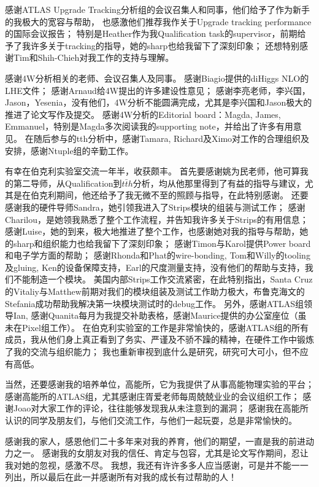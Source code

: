 感谢ATLAS Upgrade Tracking分析组的会议召集人和同事，他们给予了作为新手的我极大的宽容与帮助，
也感激他们推荐我作关于Upgrade tracking performance的国际会议报告；
特别是Heather作为我Qualification task的supervisor，前期给予了我许多关于tracking的指导，她的sharp也给我留下了深刻印象；
还想特别感谢Tim和Shih-Chieh对我工作的支持与理解。

感谢4W分析相关的老师、会议召集人及同事。
感谢Biagio提供的diHiggs NLO的LHE文件；
感谢Arnaud给4W提出的许多建设性意见；
感谢李亮老师，李兴国，Jason，Yesenia，没有他们，4W分析不能圆满完成，尤其是李兴国和Jason极大的推进了论文写作及提交。
感谢4W分析的Editorial board：Magda, James, Emmanuel，特别是Magda多次阅读我的supporting note，并给出了许多有用意见。
在随后参与的tth分析中，感谢Tamara, Richard及Ximo对工作的合理组织及安排，感谢Ntuple组的辛勤工作。

有幸在伯克利实验室交流一年半，收获颇丰。
首先要感谢姚为民老师，他可算我的第二导师，从Qualification到$t\bar{t}h$分析，均从他那里得到了有益的指导与建议，尤其是在伯克利期间，他还给予了我无微不至的照顾与指导，在此特别感谢。
还要感谢我的硬件导师Sandra，她引领我进入了Strips模块的组装与测试工作；
感谢Charilou，是她领我熟悉了整个工作流程，并告知我许多关于Strips的有用信息；
感谢Luise，她的到来，极大地推进了整个工作，也感谢她对我的指导与帮助，她的sharp和组织能力也给我留下了深刻印象；
感谢Timon与Karol提供Power board和电子学方面的帮助；
感谢Rhonda和Phat的wire-bonding, Tom和Willy的tooling及gluing, Ken的设备保障支持，Earl的尺度测量支持，没有他们的帮助与支持，我们不能制造一个模块。
美国内部Strips工作交流紧密，在此特别指出，Santa Cruz的Vitaliy与Matthew前期对我们的模块组装及测试工作助力极大，布鲁克海文的Stefania成功帮助我解决第一块模块测试时的debug工作。
另外，感谢ATLAS组领导Ian, 感谢Quanita每月为我提交补助表格，感谢Maurice提供的办公室座位（虽未在Pixel组工作）。
在伯克利实验室的工作是非常愉快的，感谢ATLAS组的所有成员，我从他们身上真正看到了务实、严谨及不骄不躁的精神，在硬件工作中锻炼了我的交流与组织能力；
我也重新审视到底什么是研究，研究可大可小，但不应有高低。

当然，还要感谢我的培养单位，高能所，它为我提供了从事高能物理实验的平台；
感谢高能所的ATLAS组，尤其感谢庄胥爱老师每周兢兢业业的会议组织工作；
感谢Joao对大家工作的评论，往往能够发现我从未注意到的漏洞；
感谢我在高能所认识的同学及朋友们，与他们交流工作，与他们一起玩耍，总是非常愉快的。

感谢我的家人，感恩他们二十多年来对我的养育，他们的期望，一直是我的前进动力之一。
感谢我的女朋友对我的信任、肯定与包容，尤其是论文写作期间，忍让我对她的忽视，感激不尽。
我想，我还有许许多多人应当感谢，可是并不能一一列出，所以最后在此一并感谢所有对我的成长有过帮助的人！

\cleardoublepage[plain]%

